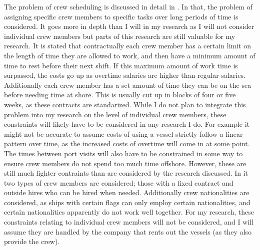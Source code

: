 \documentclass[a4paper,12pt]{article}
\begin{document}
\bigskip

The problem of crew scheduling is discussed in detail in \cite{leggate2010crew}. In that, the problem of assigning specific crew members to specific tasks over long periods of time is considered. It goes more in depth than I will in my research as I will not consider individual crew members but parts of this research are still valuable for my research. It is stated that contractually each crew member has a certain limit on the length of time they are allowed to work, and then have a minimum amount of time to rest before their next shift. If this maximum amount of work time is surpassed, the costs go up as overtime salaries are higher than regular salaries. Additionally each crew member has a set amount of time they can be on the sea before needing time at shore. This is usually cut up in blocks of four or five weeks, as these contracts are standarized. While I do not plan to integrate this problem into my research on the level of individual crew members, these constraints will likely have to be considered in any research I do. For example it might not be accurate to assume costs of using a vessel strictly follow a linear pattern over time, as the increased costs of overtime will come in at some point. The times between port visits will also have to be constrained in some way to ensure crew members do not spend too much time offshore. However, these are still much lighter contraints than are considered by the research discussed. In it two types of crew members are considered; those with a fixed contract and outside hires who can be hired when needed. Additionally crew nationalities are considered, as ships with certain flags can only employ certain nationalities, and certain nationalities apparently do not work well together. For my research, these constraints relating to individual crew members will not be considered, and I will assume they are handled by the company that rents out the vessels (as they also provide the crew). 

\bigskip
\end{document}

